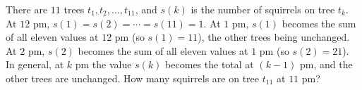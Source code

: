 There are $11$ trees $t_1,t_2,\dots,t_{11}$, and $s(k)$ is the number of squirrels on tree $t_k$. At $12$ pm, $s(1)=s(2)=\cdots=s(11)=1$. At $1$ pm, $s(1)$ becomes the sum of all eleven values at $12$ pm (so $s(1)=11$), the other trees being unchanged. At $2$ pm, $s(2)$ becomes the sum of all eleven values at $1$ pm (so $s(2)=21$). In general, at $k$ pm the value $s(k)$ becomes the total at $(k-1)$ pm, and the other trees are unchanged. How many squirrels are on tree $t_{11}$ at $11$ pm?
